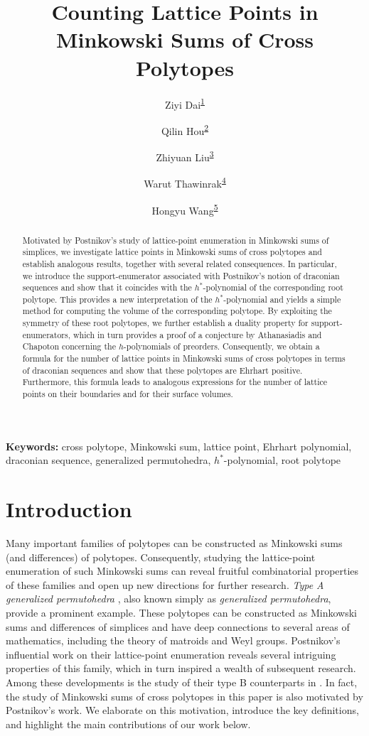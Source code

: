 \documentclass[11pt,a4paper]{article}
\title{Counting Lattice Points in Minkowski Sums of Cross Polytopes}
\author{
    Ziyi Dai\textsuperscript{\hyperlink{author1}{1}}\and
    Qilin Hou\textsuperscript{\hyperlink{author2}{2}}\and
    Zhiyuan Liu\textsuperscript{\hyperlink{author3}{3}}\and
    Warut Thawinrak\textsuperscript{\hyperlink{author4}{4}}\and
    Hongyu Wang\textsuperscript{\hyperlink{author5}{5}}
}
\date{}
\newcommand{\1}{\mathbf{1}}
\theoremstyle{plain}
\theoremstyle{definition}
\begin{document}
\maketitle

\begin{abstract}
Motivated by Postnikov’s study of lattice-point enumeration in Minkowski sums of simplices, we investigate lattice points in Minkowski sums of cross polytopes and establish analogous results, together with several related consequences. In particular, we introduce the support-enumerator associated with Postnikov’s notion of draconian sequences and show that it coincides with the $h^*$-polynomial of the corresponding root polytope. This provides a new interpretation of the $h^*$-polynomial and yields a simple method for computing the volume of the corresponding polytope. By exploiting the symmetry of these root polytopes, we further establish a duality property for support-enumerators, which in turn provides a proof of a conjecture by Athanasiadis and Chapoton concerning the $h$-polynomials of preorders. Consequently, we obtain a formula for the number of lattice points in Minkowski sums of cross polytopes in terms of draconian sequences and show that these polytopes are Ehrhart positive. Furthermore, this formula leads to analogous expressions for the number of lattice points on their boundaries and for their surface volumes. 
\end{abstract}

\noindent\textbf{Keywords:} cross polytope, Minkowski sum, lattice point, Ehrhart polynomial, draconian sequence, generalized permutohedra, $h^*$-polynomial, root polytope

\vspace{0.3in}

\section{Introduction}\label{sec:intro}
Many important families of polytopes can be constructed as Minkowski sums (and differences) of polytopes. Consequently, studying the lattice-point enumeration of such Minkowski sums can reveal fruitful combinatorial properties of these families and open up new directions for further research. \textit{Type A generalized permutohedra} \cite{Postnikov2009}, also known simply as \textit{generalized permutohedra}, provide a prominent example. These polytopes can be constructed as Minkowski sums and differences of simplices \cite{Postnikov2009,Ardila2010} and have deep connections to several areas of mathematics, including the theory of matroids and Weyl groups. Postnikov’s influential work on their lattice-point enumeration \cite{Postnikov2009} reveals several intriguing properties of this family, which in turn inspired a wealth of subsequent research. Among these developments is the study of their type B counterparts in \cite{Euretall2024,thawinrak2025AtoB}. In fact, the study of Minkowski sums of cross polytopes in this paper is also motivated by Postnikov’s work. We elaborate on this motivation, introduce the key definitions, and highlight the main contributions of our work below.
\end{document}

